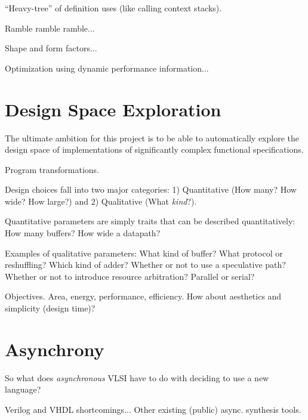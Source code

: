 ``Heavy-tree'' of definition uses (like calling context stacks).  

Ramble ramble ramble...

Shape and form factors...

Optimization using dynamic performance information...

\section{Design Space Exploration}
\label{sec:goals:explore}

The ultimate ambition for this project is to be able to 
automatically explore the design space of implementations of
significantly complex functional specifications.  

Program transformations.  

Design choices fall into two major categories:
1) Quantitative (How many?  How wide?  How large?) and
2) Qualitative (What \emph{kind}?).  

Quantitative parameters are simply traits that can be described
quantitatively:  How many buffers?  How wide a datapath?  

Examples of qualitative parameters:
What kind of buffer?  What protocol or reshuffling?  
Which kind of adder?  Whether or not to use a speculative path?
Whether or not to introduce resource arbitration?
Parallel or serial?

Objectives.
Area, energy, performance, efficiency.  
How about aesthetics and simplicity (design time)?  

\section{Asynchrony}
\label{sec:goals:async}

So what does \emph{asynchronous} VLSI have to do with deciding
to use a new language?  

Verilog and VHDL shortcomings...
Other existing (public) async. synthesis tools.  



